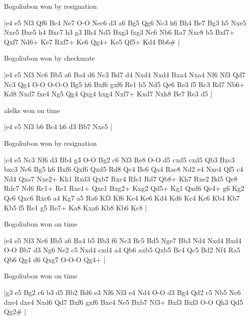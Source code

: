\showboard

Bogoliubon won by resignation

\makegametitle
|e4 e5 Nf3 Qf6 Bc4 Ne7 O-O Nec6 d3 a6 Bg5 Qg6 Nc3 h6 Bh4 Be7 Bg3 h5 Nxe5 Nxe5 Bxe5 h4 Bxc7 h3 g3 Bh4 Nd5 Bxg3 fxg3 Nc6 Nb6 Ra7 Nxc8 b5 Bxf7+ Qxf7 Nd6+ Ke7 Rxf7+ Ke6 Qg4+ Ke5 Qf5+ Kd4 Bb6\#  |

\showboard

Bogoliubon won by checkmate

\makegametitle
|e4 e5 Nf3 Nc6 Bb5 a6 Ba4 d6 Nc3 Bd7 d4 Nxd4 Nxd4 Bxa4 Nxa4 Nf6 Nf3 Qd7 Nc3 Qg4 O-O O-O-O Bg5 h6 Bxf6 gxf6 Re1 h5 Nd5 Qe6 Re3 f5 Rc3 Rd7 Nb6+ Kd8 Nxd7 fxe4 Ng5 Qg4 Qxg4 hxg4 Nxf7+ Kxd7 Nxh8 Be7 Re3 d5  |

\showboard

alelks won on time

\makegametitle
|e4 e5 Nf3 b6 Bc4 h6 d3 Bb7 Nxe5  |

\showboard

Bogoliubon won by resignation

\makegametitle
|c4 e5 Nc3 Nf6 d3 Bb4 g3 O-O Bg2 c6 Nf3 Re8 O-O d5 cxd5 cxd5 Qb3 Bxc3 bxc3 Nc6 Bg5 h6 Bxf6 Qxf6 Qxd5 Rd8 Qc4 Be6 Qa4 Rac8 Nd2 e4 Nxe4 Qf5 c4 Nd4 Qxa7 Nxe2+ Kh1 Rxd3 Qxb7 Rxc4 Rfe1 Rd7 Qb8+ Kh7 Rxe2 Bd5 Qe8 Rdc7 Nd6 Rc1+ Re1 Rxe1+ Qxe1 Bxg2+ Kxg2 Qd5+ Kg1 Qxd6 Qe4+ g6 Kg2 Qc6 Qxc6 Rxc6 a4 Kg7 a5 Ra6 Kf3 Kf6 Ke4 Ke6 Kd4 Kd6 Kc4 Kc6 Kb4 Kb7 Kb5 f5 Re1 g5 Re7+ Ka8 Kxa6 Kb8 Kb6 Kc8  |

\showboard

Bogoliubon won on time

\makegametitle
|e4 e5 Nf3 Nc6 Bb5 a6 Ba4 b5 Bb3 f6 Nc3 Bc5 Bd5 Nge7 Bb3 Nd4 Nxd4 Bxd4 O-O Bb7 d3 Ng6 Ne2 c5 Nxd4 cxd4 a4 Qb6 axb5 Qxb5 Bc4 Qc5 Bd2 Nf4 Ra5 Qb6 Qg4 d6 Qxg7 O-O-O Qg4+  |

\showboard

Bogoliubon won on time

\makegametitle
|g3 e5 Bg2 c6 b3 d5 Bb2 Bd6 e3 Nf6 Nf3 e4 Nd4 O-O d3 Bg4 Qd2 c5 Nb5 Nc6 dxe4 dxe4 Nxd6 Qd7 Bxf6 gxf6 Bxe4 Ne5 Bxb7 Nf3+ Bxf3 Bxf3 O-O Qh3 Qd5 Qg2\#  |

